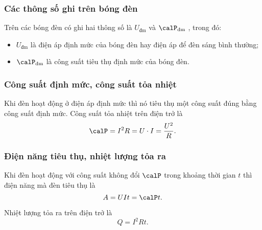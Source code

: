 \subsubsection{Các thông số ghi trên bóng đèn}
Trên các bóng đèn có ghi hai thông số là $U_\text{đm}$ và $\calP_\text{đm}$ , trong đó:
\begin {itemize}
\item $U_\text{đm}$ là điện áp định mức của bóng đèn hay điện áp để đèn sáng bình thường;
\item $\calP_\text{đm}$ là công suất tiêu thụ định mức của bóng đèn.
\end{itemize}
\subsubsection{Công suất định mức, công suất tỏa nhiệt}
Khi đèn hoạt động ở điện áp định mức thì nó tiêu thụ một công suất đúng bằng công suất định mức.
Công suất tỏa nhiệt trên điện trở là
\begin{equation*}
\calP = I^2 R=U \cdot I= \dfrac{U^2}{R}.
\end{equation*}
\subsubsection{Điện năng tiêu thụ, nhiệt lượng tỏa ra}
Khi đèn hoạt động với công suất không đổi $\calP$ trong khoảng thời gian $t$ thì điện năng mà đèn tiêu thụ là
\begin{equation*}
A = UIt = \calP t.
\end{equation*}

Nhiệt lượng tỏa ra trên điện trở là
\begin{equation*}
Q=I^2 Rt.
\end{equation*}

